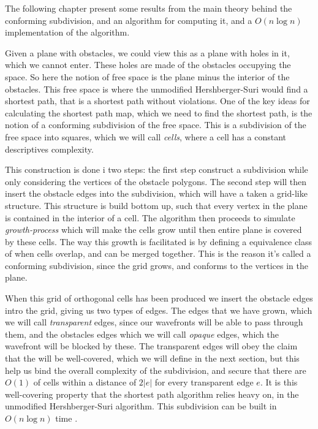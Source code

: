 \label{chapter:conformingsubdivision}

The following chapter present some results  from the main theory behind the conforming subdivision, and an 
algorithm for computing it, and a $O(n \log n)$ implementation of the algorithm. 

Given a plane with obstacles, we could view this as a plane with holes in it, which we 
cannot enter. These holes are made of the obstacles occupying the space. So here the notion 
of free space is the plane minus the interior of the obstacles. This free space is where the 
unmodified Hershberger-Suri would find a shortest path, that is a shortest path without 
violations. One of the key ideas for calculating the shortest path map, which we need to 
find the shortest path, is the notion of a conforming subdivision of the free space. This is 
a subdivision of the free space into squares, which we will call \textit{cells}, where a 
cell has a constant descriptives complexity. 

This construction is done i two steps: the 
first step construct a subdivision while only considering the vertices of the obstacle 
polygons. The second step will then insert the obstacle edges into the subdivision, which 
will have a taken a grid-like structure. This structure is build bottom up, such that every 
vertex in the plane is contained in the interior of a cell. The algorithm then proceeds to 
simulate \textit{growth-process} which will make the cells grow until then entire plane is 
covered by these cells. The way this growth is facilitated is by defining a equivalence 
class of when cells overlap, and can be merged together. This is the reason it's called a 
conforming subdivision, since the grid grows, and conforms to the vertices in the plane. 


When this grid of orthogonal cells has been produced we insert the obstacle edges intro the 
grid, giving us two types of edges. The edges that we have grown, which we will call 
\textit{transparent} edges, since our wavefronts will be able to pass through them, and the 
obstacles edges which we will call \textit{opaque} edges, which the wavefront will be 
blocked by these. The transparent edges will obey the claim that the will be well-covered, 
which we will define in the next section, but this help us bind the overall complexity of 
the subdivision, and secure that there are $O(1)$ of cells within a distance of $2|e|$ for 
every transparent edge $e$. It is this well-covering property that the shortest path 
algorithm relies heavy on, in the unmodified Hershberger-Suri algorithm. This subdivision 
can be built in $O(n \log n)$ time \cite{HershbergerS99}.

